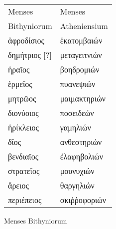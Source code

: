 %
\normalsize
\centering
\begin{tabular}{ l  l }
Menses                    & Menses\\
Bithyniorum               & Atheniensium \\
\hline
\textgreek{ἀφροδίσιος}    &\textgreek{ἑκατομβαιών} \\
\textgreek{δημήτριος [?]} &\textgreek{μεταγειτνιών} \\
\textgreek{ἡραῖος}        &\textgreek{βοηδρομιών} \\
%
\textgreek{ἑρμεῖος}        &\textgreek{πυανεψιών} \\
\textgreek{μητρῶος}       &\textgreek{μαιμακτηριών} \\
\textgreek{διονύοιος}      &\textgreek{ποσειδεών} \\
%
\textgreek{ἡρίκλειος}       &\textgreek{γαμηλιών} \\
\textgreek{δῖος}           &\textgreek{ανθεστηριών} \\
\textgreek{βενδιαῖος}        &\textgreek{ἐλαφηβολιών} \\
%
\textgreek{στρατεῖος}      &\textgreek{μουνυχιών} \\
\textgreek{ἄρειος}          &\textgreek{θαργηλιών} \\
\textgreek{περιέπειος}      &\textgreek{σκιῤῥοφοριών} \\
\end{tabular}
%
\caption{Menses Bithyniorum}
\label{tab:p050b}
